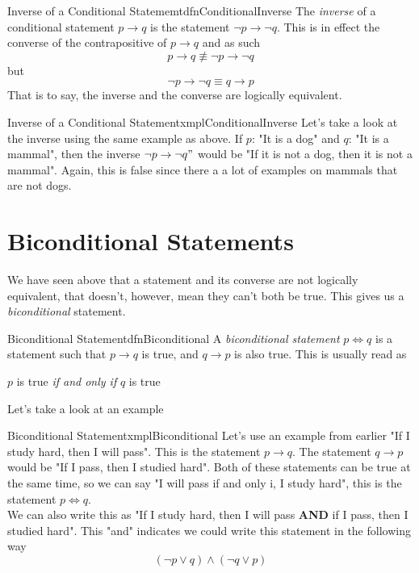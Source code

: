 \begin{dfn}[label={def:conditionalInverse}]{Inverse of a Conditional Statememt}{dfnConditionalInverse}
    The \emph{inverse} of a conditional statement $p \to q$ is the statement $\lnot p \to \lnot q$. This is in effect the converse of the contrapositive of $p \to q$ and as such
    $$p \to q \not \equiv \lnot p \to \lnot q$$
    but
    $$\lnot p \to \lnot q \equiv q \to p$$
    That is to say, the inverse and the converse are logically equivalent.
\end{dfn}

\begin{exmpl}[label={exmpl:conditionalInverse}]{Inverse of a Conditional Statement}{xmplConditionalInverse}
    Let's take a look at the inverse using the same example as above. If $p$: "It is a dog" and $q$: "It is a mammal", then the inverse $\lnot p \to \lnot q"$ would be "If it is not a dog, then it is not a mammal". Again, this is false since there a a lot of examples on mammals that are not dogs.
\end{exmpl}

\section{Biconditional Statements}
We have seen above that a statement and its converse are not logically equivalent, that doesn't, however, mean they can't both be true. This gives us a \emph{biconditional} statement.

\begin{dfn}[label={def:biconditional}]{Biconditional Statement}{dfnBiconditional}
    A \emph{biconditional statement} $p \iff q$ is a statement such that $p \to q$ is true, and $q \to p$ is also true. This is usually read as \begin{center}
        $p$ is true \emph{if and only if} $q$ is true
    \end{center}
\end{dfn}

Let's take a look at an example

\begin{exmpl}[label={exmpl:biconditional}]{Biconditional Statement}{xmplBiconditional}
    Let's use an example from earlier "If I study hard, then I will pass". This is the statement $p \to q$. The statement $q \to p$ would be "If I pass, then I studied hard". Both of these statements can be true at the same time, so we can say "I will pass if and only i, I study hard", this is the statement $p \iff q$.\\

    We can also write this as "If I study hard, then I will pass \textbf{AND} if I pass, then I studied hard". This "and" indicates we could write this statement in the following way
    $$ (\lnot p \lor q ) \land (\lnot q \lor p)$$
\end{exmpl}